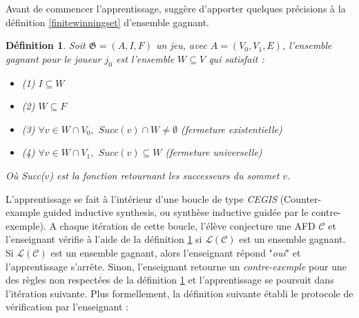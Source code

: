\documentclass[12pt,a4paper,oneside,titlepage]{report}
\newtheorem{defi}{D\'efinition}[section]
\begin{document}
Avant de commencer l'apprentissage, \cite{NeiderAutomaton} suggère d'apporter quelques précisions à la définition \ref{finitewinningset} d'ensemble gagnant.
\begin{defi}
\label{infinitewinningset}
Soit $\mathfrak{G}=(A,I,F)$ un jeu, avec $A=(V_0, V_1, E)$, l'\emph{ensemble gagnant} pour le joueur $j_0$ est l'ensemble $W\subseteq V$ qui satisfait :
\begin{itemize}
\item (1) $I\subseteq W$ 
\item (2) $W\subseteq F$ 
\item (3) $\forall v\in W\cap V_0,$ $Succ(v)\cap W\neq\emptyset$ (\emph{fermeture existentielle})
\item (4) $\forall v\in W\cap V_1,$ $Succ(v)\subseteq W$ (\emph{fermeture universelle})
\end{itemize}
Où \emph{Succ($v$)} est la fonction retournant les successeurs du sommet $v$.
\end{defi}
L'apprentissage se fait à l'intérieur d'une boucle de type \emph{CEGIS} (Counter-example guided inductive synthesis, ou synthèse inductive guidée par le contre-exemple). A chaque itération de cette boucle, l'élève conjecture une AFD $\mathcal{C}$ et l'enseignant vérifie à l'aide de la définition \ref{infinitewinningset} si $\mathcal{L}(\mathcal{C})$ est un ensemble gagnant. Si $\mathcal{L}(\mathcal{C})$ est un ensemble gagnant, alors l'enseignant répond "\emph{oui}" et l'apprentissage s'arrête. Sinon, l'enseignant retourne un \emph{contre-exemple} pour une des règles non respectées de la définition \ref{infinitewinningset} et l'apprentissage se poursuit dans l'itération suivante. Plus formellement, la définition suivante établi le protocole de vérification par l'enseignant :
\end{document}
